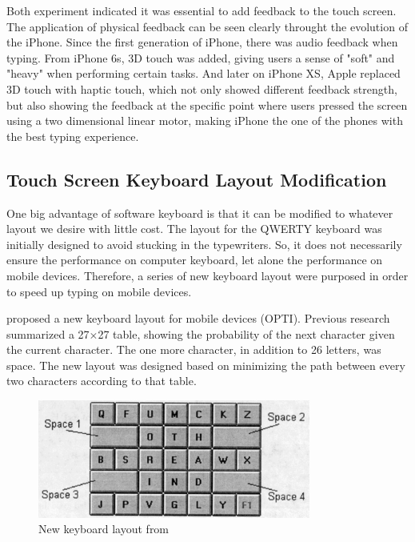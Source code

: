 \documentclass[11pt]{article}
\begin{document}
Both experiment indicated it was essential to add feedback to the touch screen. The application of physical feedback can be seen clearly throught the evolution of the iPhone. Since the first generation of iPhone, there was audio feedback when typing. From iPhone 6s, 3D touch was added, giving users a sense of "soft" and "heavy" when performing certain tasks. And later on iPhone XS, Apple replaced 3D touch with haptic touch, which not only showed different feedback strength, but also showing the feedback at the specific point where users pressed the screen using a two dimensional linear motor, making iPhone the one of the phones with the best typing experience.

\subsection{Touch Screen Keyboard Layout Modification}
One big advantage of software keyboard is that it can be modified to whatever layout we desire with little cost. The layout for the QWERTY keyboard was initially designed to avoid stucking in the typewriters. So, it does not necessarily ensure the performance on computer keyboard, let alone the performance on mobile devices. Therefore, a series of new keyboard layout were purposed in order to speed up typing on mobile devices.

\citet{10.1145/302979.302983} proposed a new keyboard layout for mobile devices (OPTI). Previous research summarized a 27$\times$27 table, showing the probability of the next character given the current character. The one more character, in addition to 26 letters, was space. The new layout was designed based on minimizing the path between every two characters according to that table.

\begin{figure}[H]
  \centering
  \includegraphics[width=0.8\textwidth]{Layout1999.png}
  \caption{New keyboard layout from \citep{10.1145/302979.302983}}
  \label{fig:layout1999}
\end{figure}
\end{document}
